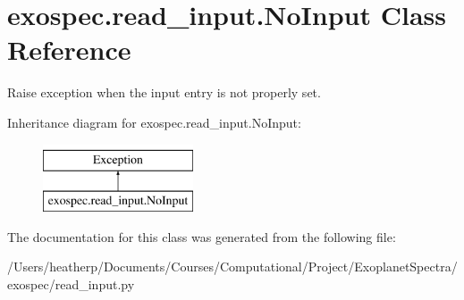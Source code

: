 \hypertarget{classexospec_1_1read__input_1_1_no_input}{}\section{exospec.\+read\+\_\+input.\+No\+Input Class Reference}
\label{classexospec_1_1read__input_1_1_no_input}


Raise exception when the input entry is not properly set.  


Inheritance diagram for exospec.\+read\+\_\+input.\+No\+Input\+:\begin{figure}[H]
\begin{center}
\leavevmode
\includegraphics[height=2.000000cm]{classexospec_1_1read__input_1_1_no_input}
\end{center}
\end{figure}


The documentation for this class was generated from the following file\+:\begin{DoxyCompactItemize}
\item 
/\+Users/heatherp/\+Documents/\+Courses/\+Computational/\+Project/\+Exoplanet\+Spectra/exospec/read\+\_\+input.\+py\end{DoxyCompactItemize}
